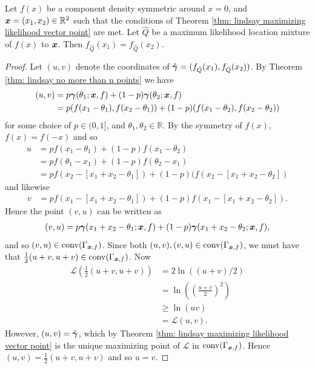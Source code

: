 		\begin{lemma}
		\label{lemma: maximizing point on line u = v}
			Let $f(x)$ be a component density symmetric around $x = 0$, and ${\bm{{x}}} = (x_1, x_2) \in \mathbb{R}^2$ such that the conditions of Theorem \ref{thm: lindsay maximizing likelihood vector point} are met. Let $\hat{Q}$ be a maximum likelihood location mixture of $f(x)$ to ${\bm{{x}}}$. Then $f_{\hat{Q}}(x_1) = f_{\hat{Q}}(x_2)$.
		\end{lemma}
		\begin{proof}
			Let $(u, v)$ denote the coordinates of $\hat{{\bm{{\gamma}}}}  = (f_{\hat{Q}}(x_1), f_{\hat{Q}}(x_2))$. By Theorem \ref{thm: lindsay no more than n points} we have
			\begin{align}
				(u, v) &= p {\bm{{\gamma}}}(\theta_1; {\bm{{x}}}, f) + (1 - p) {\bm{{\gamma}}}(\theta_2;{\bm{{x}}}, f)\\
					&= p (f(x_1 - \theta_1), f(x_2 - \theta_1)) + (1 -p) (f(x_1 - \theta_2), f(x_2 - \theta_2))
			\end{align}
			for some choice of $p \in (0, 1]$, and $\theta_1, \theta_2 \in \mathbb{R}$. By the symmetry of $f(x)$, $f(x) = f(-x)$ and so
			\begin{align}
				u &= p f(x_1 - \theta_1) + (1 - p)f(x_1 - \theta_2)\\
					&= p f(\theta_1 - x_1) + (1 - p)f(\theta_2 - x_1)\\
					&= p f(x_2 - [x_1 + x_2 - \theta_1]) + (1 - p) (f(x_2 - [x_1 + x_2 - \theta_2])
			\end{align}
			and likewise
			\begin{align}
				v &= p f(x_1 - [x_1+x_2 - \theta_1]) + (1 - p) f(x_1 - [x_1 + x_2 - \theta_2]).
			\end{align}
			Hence the point $(v, u)$ can be written as
			\begin{align}
				(v, u) = p {\bm{{\gamma}}}(x_1 + x_2 - \theta_1;{\bm{{x}}}, f) + (1 - p) {\bm{{\gamma}}}(x_1 + x_2 - \theta_2;{\bm{{x}}}, f),
			\end{align}
			and so $(v, u) \in \mathrm{conv}(\Gamma_{{\bm{{x}}}, f})$.
			Since both $(u, v), (v, u) \in \mathrm{conv}(\Gamma_{{\bm{{x}}}, f})$, we must have that $\frac{1}{2}(u+v, u + v) \in \mathrm{conv}(\Gamma_{{\bm{{x}}}, f})$. Now
			\begin{align}
				\mathcal{L}\left(\frac{1}{2}(u+v, u + v)\right) &= 2\ln((u+v)/2)\\
					&= \ln\left(\left(\frac{u+v}{2}\right)^2\right)\\
					&\geq \ln(uv)\\
					&= \mathcal{L}(u,v).
			\end{align}
			However, $(u, v) = \hat{{\bm{{\gamma}}}}$, which by Theorem \ref{thm: lindsay maximizing likelihood vector point} is the unique maximizing point of $\mathcal{L}$ in $\mathrm{conv}(\Gamma_{{\bm{{x}}}, f})$. Hence $(u, v) = \frac{1}{2}(u+v, u+v)$ and so $u = v$.
		\end{proof}

